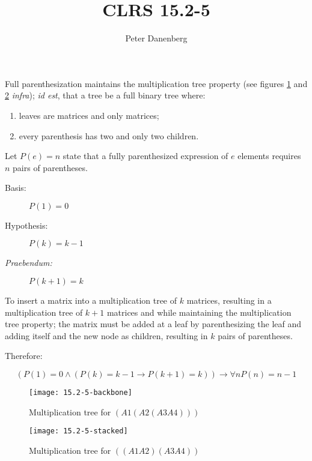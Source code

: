 \documentclass{article}
\title{CLRS 15.2-5}
\author{Peter Danenberg}
\begin{document}
\maketitle

Full parenthesization maintains the multiplication tree property (see
figures \ref{fig:backbone} and \ref{fig:stacked} \emph{infra});
\emph{id est}, that a tree be a full binary tree where:

\begin{enumerate}
\item leaves are matrices and only matrices;
\item every parenthesis has two and only two children.
\end{enumerate}

Let $P(e) = n$ state that a fully parenthesized expression of $e$
elements requires $n$ pairs of parentheses.

\begin{description}
  \item[Basis:] $P(1) = 0$
  \item[Hypothesis:] $P(k) = k-1$
  \item[\emph{Praebendum:}] $P(k + 1) = k$
\end{description}

To insert a matrix into a multiplication tree of $k$ matrices,
resulting in a multiplication tree of $k+1$ matrices and while
maintaining the multiplication tree property; the matrix must be added
at a leaf by parenthesizing the leaf and adding itself and the new
node as children, resulting in $k$ pairs of parentheses.

Therefore:

\[(P(1)=0 \wedge (P(k)=k-1 \to P(k+1)=k)) \to \forall nP(n)=n-1\]

\begin{figure}[ht]
  \centering
  \texttt{[image: 15.2-5-backbone]}
  \caption{Multiplication tree for $(A1 (A2 (A3 A4)))$}
  \label{fig:backbone}
\end{figure}

\begin{figure}[ht]
  \centering
  \texttt{[image: 15.2-5-stacked]}
  \caption{Multiplication tree for $((A1 A2)(A3 A4))$}
  \label{fig:stacked}
\end{figure}
\end{document}
